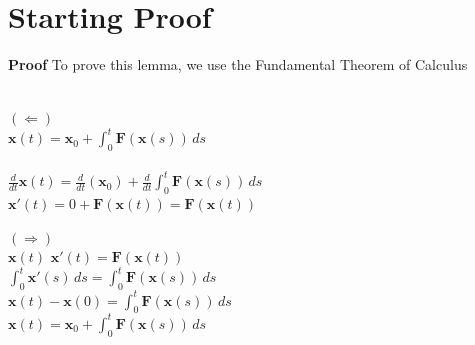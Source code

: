 \documentclass[12pt]{article}
\begin{document}
\section*{Starting Proof}
\textbf{Proof} To prove this lemma, we use the Fundamental Theorem of Calculus\\\\
\noindent
\begin{minipage}[t]{0.55\textwidth}
    \textbf{$(\Leftarrow)$} \\[6pt]
     $\displaystyle \mathbf{x}(t) = \mathbf{x}_0 + \int_{0}^{t} \mathbf{F}(\mathbf{x}(s)) \, ds$ \\[6pt]
     \\
    $\displaystyle \frac{d}{dt} \mathbf{x}(t) = \frac{d}{dt}(\mathbf{x}_0) + \frac{d}{dt}\int_{0}^{t} \mathbf{F}(\mathbf{x}(s)) \, ds$ \\[12pt]
    $\mathbf{x}'(t) = 0 + \mathbf{F}(\mathbf{x}(t)) = \mathbf{F}(\mathbf{x}(t))$
\end{minipage}
\hfill
\begin{minipage}[t]{0.55\textwidth}
    \textbf{$(\Rightarrow)$} \\
     $\mathbf{x}(t)$  $\mathbf{x}'(t) = \mathbf{F}(\mathbf{x}(t))$ \\[6pt]
    $\displaystyle \int_{0}^{t} \mathbf{x}'(s) \, ds = \int_{0}^{t} \mathbf{F}(\mathbf{x}(s)) \, ds$ \\[6pt]
    $\displaystyle \mathbf{x}(t) - \mathbf{x}(0) = \int_{0}^{t} \mathbf{F}(\mathbf{x}(s)) \, ds$ \\[6pt]
    $\displaystyle \mathbf{x}(t) = \mathbf{x}_0 + \int_{0}^{t} \mathbf{F}(\mathbf{x}(s)) \, ds$
\end{minipage}

\vspace{2cm}
\end{document}
